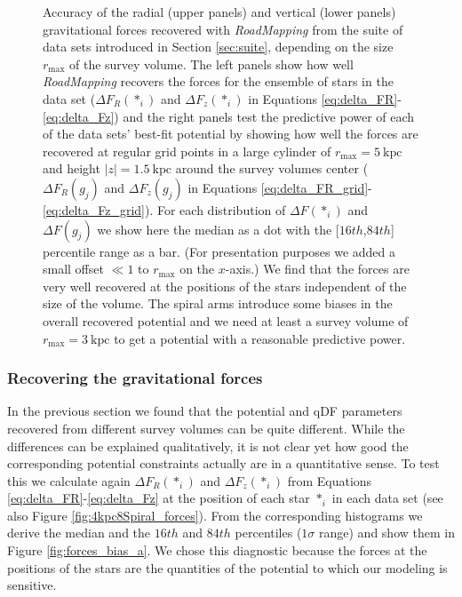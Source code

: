 \documentclass[iop,revtex4,numberedappendix,appendixfloats]{emulateapj}
\newcommand{\RM}{{\sl RoadMapping}}
\begin{document}
\begin{figure}[!htbp]
\caption{Accuracy of the radial (upper panels) and vertical (lower panels) gravitational forces recovered with \RM{} from the suite of data sets introduced in Section \ref{sec:suite}, depending on the size $r_\text{max}$ of the survey volume. The left panels show how well \RM{} recovers the forces for the ensemble of stars in the data set ($\Delta F_{R}(*_i)$ and $\Delta F_{z}(*_i)$ in Equations \eqref{eq:delta_FR}-\eqref{eq:delta_Fz}) and the right panels test the predictive power of each of the data sets' best-fit potential by showing how well the forces are recovered at regular grid points in a large cylinder of $r_\text{max}=5~\text{kpc}$ and height $|z|=1.5~\text{kpc}$ around the survey volumes center ($\Delta F_{R}(g_j)$ and $\Delta F_{z}(g_j)$ in Equations \eqref{eq:delta_FR_grid}-\eqref{eq:delta_Fz_grid}). For each distribution of $\Delta F(*_i)$ and $\Delta F(g_j)$ we show here the median as a dot with the  [$16th$,$84th$] percentile range as a bar. (For presentation purposes we added a small offset $\ll 1$ to $r_\text{max}$ on the $x$-axis.) We find that the forces are very well recovered at the positions of the stars independent of the size of the volume. The spiral arms introduce some biases in the overall recovered potential and we need at least a survey volume of $r_\text{max}=3~\text{kpc}$ to get a potential with a reasonable predictive power.}
\label{fig:forces_bias}
\end{figure}


\subsubsection{Recovering the gravitational forces}\label{sec:forces_bias}

In the previous section we found that the potential and qDF parameters recovered from different survey volumes can be quite different. While the differences can be explained qualitatively, it is not clear yet how good the corresponding potential constraints actually are in a quantitative sense. To test this we calculate again $\Delta F_R(*_i)$ and $\Delta F_z(*_i)$ from Equations \eqref{eq:delta_FR}-\eqref{eq:delta_Fz} at the position of each star $*_i$ in each data set (see also Figure \ref{fig:4kpc8Spiral_forces}). From the corresponding histograms we derive the median and the $16th$ and $84th$ percentiles ($1\sigma$ range) and show them in Figure \ref{fig:forces_bias_a}. We chose this diagnostic because the forces at the positions of the stars are the quantities of the potential to which our modeling is sensitive.
\end{document}

